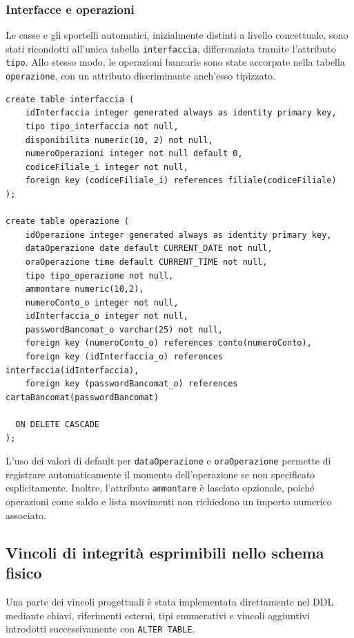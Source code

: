 \subsubsection{Interfacce e operazioni}
Le casse e gli sportelli automatici, inizialmente distinti a livello concettuale, sono stati ricondotti all'unica tabella \texttt{interfaccia}, differenziata tramite l'attributo \texttt{tipo}. Allo stesso modo, le operazioni bancarie sono state accorpate nella tabella \texttt{operazione}, con un attributo discriminante anch'esso tipizzato.

\begin{lstlisting}[caption={Tabelle interfaccia e operazione}]
create table interfaccia (
    idInterfaccia integer generated always as identity primary key,
    tipo tipo_interfaccia not null,
    disponibilita numeric(10, 2) not null,
    numeroOperazioni integer not null default 0,
    codiceFiliale_i integer not null,
    foreign key (codiceFiliale_i) references filiale(codiceFiliale)
);

create table operazione (
    idOperazione integer generated always as identity primary key,
    dataOperazione date default CURRENT_DATE not null,
    oraOperazione time default CURRENT_TIME not null,
    tipo tipo_operazione not null,
    ammontare numeric(10,2),
    numeroConto_o integer not null,
    idInterfaccia_o integer not null,
    passwordBancomat_o varchar(25) not null,
    foreign key (numeroConto_o) references conto(numeroConto),
    foreign key (idInterfaccia_o) references interfaccia(idInterfaccia),
    foreign key (passwordBancomat_o) references cartaBancomat(passwordBancomat)

  ON DELETE CASCADE
);
\end{lstlisting}

L'uso dei valori di default per \texttt{dataOperazione} e \texttt{oraOperazione} permette di registrare automaticamente il momento dell'operazione se non specificato esplicitamente. Inoltre, l'attributo \texttt{ammontare} è lasciato opzionale, poiché operazioni come saldo e lista movimenti non richiedono un importo numerico associato.

\subsection{Vincoli di integrità esprimibili nello schema fisico}
Una parte dei vincoli progettuali è stata implementata direttamente nel DDL mediante chiavi, riferimenti esterni, tipi enumerativi e vincoli aggiuntivi introdotti successivamente con \texttt{ALTER TABLE}.

